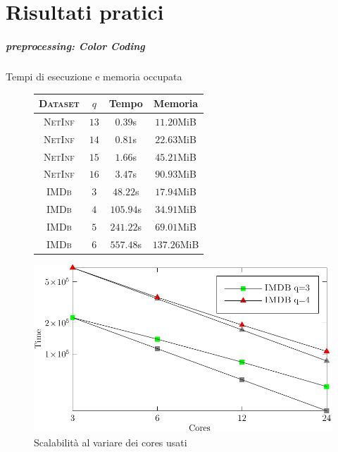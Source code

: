 \part{Risultati pratici}

\begin{frame}
	\partpage
	\centering
\end{frame}

\begin{frame}
	\frametitle{preprocessing: Color Coding}
	\centering
	\Large
	Tempi di esecuzione e memoria occupata
	\pause
	
	\small
	\begin{figure}[h]
		\centering
		\begin{minipage}[ht]{.49\textwidth}
			\centering
			\begin{table}
				\centering
				\begin{tabular}{|c|c|c|c|}
					\hline
					\textsc{Dataset} & $q$  &               Tempo & Memoria \\ \hline \hline
					\textsc{NetInf}  & $13$ & \phantom{11}$0.39$s & \phantom{1}$11.20$MiB     \\ \hline
					\textsc{NetInf}  & $14$ & \phantom{11}$0.81$s & \phantom{1}$22.63$MiB     \\ \hline
					\textsc{NetInf}  & $15$ & \phantom{11}$1.66$s & \phantom{1}$45.21$MiB     \\ \hline
					\textsc{NetInf}  & $16$ & \phantom{11}$3.47$s & \phantom{1}$90.93$MiB     \\ \hline \hline
					\textsc{IMDb}    & $3$  & \phantom{1}$48.22$s & \phantom{1}$17.94$MiB     \\ \hline
					\textsc{IMDb}    & $4$  &           $105.94$s & \phantom{1}$34.91$MiB     \\ \hline
					\textsc{IMDb}    & $5$  &           $241.22$s & \phantom{1}$69.01$MiB     \\ \hline
					\textsc{IMDb}    & $6$  &           $557.48$s & $137.26$MiB     \\ \hline
				\end{tabular}
			\end{table}
		\end{minipage}
		\pause
		\begin{minipage}[ht]{.49\textwidth}
			\centering
			\includegraphics[width=.9\textwidth]{images/3_color_coding}
			\caption{Scalabilità al variare dei cores usati}
		\end{minipage}
	\end{figure}
	
\end{frame}


